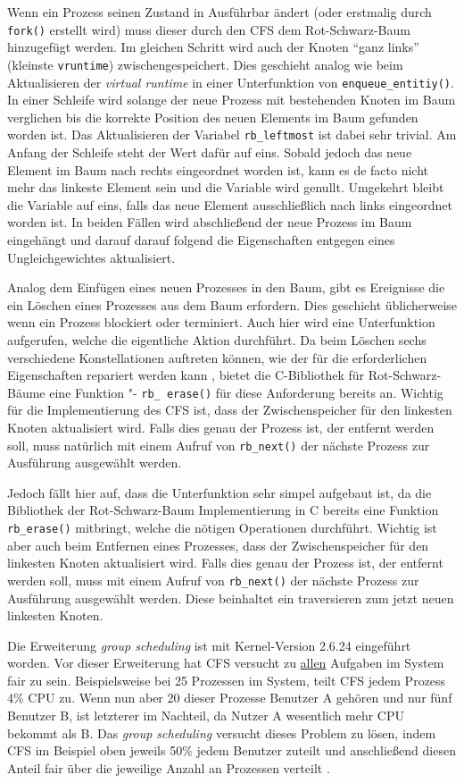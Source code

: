 Wenn ein Prozess seinen Zustand in Ausführbar ändert (oder erstmalig durch \texttt{fork()} erstellt wird) muss dieser durch den CFS dem Rot-Schwarz-Baum hinzugefügt werden. Im gleichen Schritt wird auch der Knoten ``ganz links'' (kleinste \texttt{vruntime}) zwischengespeichert. Dies geschieht analog wie beim Aktualisieren der \textit{virtual runtime} in einer Unterfunktion von \texttt{enqueue\_entitiy()}. In einer Schleife wird solange der neue Prozess mit bestehenden Knoten im Baum verglichen bis die korrekte Position des neuen Elements im Baum gefunden worden ist. Das Aktualisieren der Variabel \texttt{rb\_leftmost} ist dabei sehr trivial. Am Anfang der Schleife steht der Wert dafür auf eins. Sobald jedoch das neue Element im Baum nach rechts eingeordnet worden ist, kann es de facto nicht mehr das linkeste Element sein und die Variable wird genullt. Umgekehrt bleibt die Variable auf eins, falls das neue Element ausschließlich nach links eingeordnet worden ist. 
In beiden Fällen wird abschließend der neue Prozess im Baum eingehängt und darauf darauf folgend die Eigenschaften entgegen eines Ungleichgewichtes aktualisiert.

Analog dem Einfügen eines neuen Prozesses in den Baum, gibt es Ereignisse die ein Löschen eines Prozesses aus dem Baum erfordern. Dies geschieht üblicherweise wenn ein Prozess blockiert oder terminiert. Auch hier wird eine Unterfunktion aufgerufen, welche die eigentliche Aktion durchführt.
Da beim Löschen sechs verschiedene Konstellationen auftreten können, wie der für die erforderlichen Eigenschaften repariert werden kann \cite{tcormen}, bietet die C-Bibliothek für Rot-Schwarz-Bäume eine Funktion "- \texttt{rb\_ erase()} für diese Anforderung bereits an. Wichtig für die Implementierung des CFS ist, dass der Zwischenspeicher für den linkesten Knoten aktualisiert wird. Falls dies genau der Prozess ist, der entfernt werden soll, muss natürlich mit einem Aufruf von \texttt{rb\_next()} der nächste Prozess zur Ausführung ausgewählt werden. 

Jedoch fällt hier auf, dass die Unterfunktion sehr simpel aufgebaut ist, da die Bibliothek der Rot-Schwarz-Baum Implementierung in C bereits eine Funktion \texttt{rb\_erase()} mitbringt, welche die nötigen Operationen durchführt. Wichtig ist aber auch beim Entfernen eines Prozesses, dass der Zwischenspeicher für den linkesten Knoten aktualisiert wird. Falls dies genau der Prozess ist, der entfernt werden soll, muss mit einem Aufruf von \texttt{rb\_next()} der nächste Prozess zur Ausführung ausgewählt werden. Diese beinhaltet ein traversieren zum jetzt neuen linkesten Knoten.

Die Erweiterung \textit{group scheduling} ist mit Kernel-Version 2.6.24 eingeführt worden. Vor dieser Erweiterung hat CFS versucht zu \underline{allen} Aufgaben im System fair zu sein. Beispielsweise bei 25 Prozessen im System, teilt CFS jedem Prozess 4\% CPU zu. Wenn nun aber 20 dieser Prozesse Benutzer A gehören und nur fünf Benutzer B, ist letzterer im Nachteil, da Nutzer A wesentlich mehr CPU bekommt als B. Das \textit{group scheduling} versucht dieses Problem zu lösen, indem CFS im Beispiel oben jeweils 50\% jedem Benutzer zuteilt und anschließend diesen Anteil fair über die jeweilige Anzahl an Prozessen verteilt \cite{cpabla}. 
